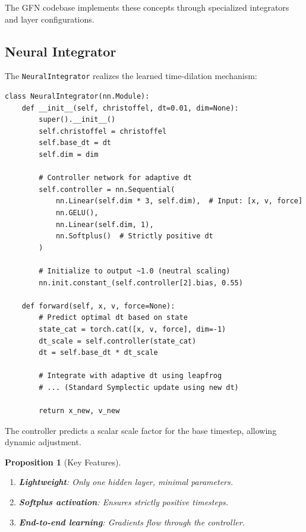 \documentclass[12pt,letterpaper,twoside]{article}
\newtheorem{prop}{Proposition}[section]
\begin{document}
The GFN codebase implements these concepts through specialized integrators and layer configurations.

\subsection{Neural Integrator}

The \texttt{NeuralIntegrator} realizes the learned time-dilation mechanism:

\begin{verbatim}
class NeuralIntegrator(nn.Module):
    def __init__(self, christoffel, dt=0.01, dim=None):
        super().__init__()
        self.christoffel = christoffel
        self.base_dt = dt
        self.dim = dim
        
        # Controller network for adaptive dt
        self.controller = nn.Sequential(
            nn.Linear(self.dim * 3, self.dim),  # Input: [x, v, force]
            nn.GELU(),
            nn.Linear(self.dim, 1),
            nn.Softplus()  # Strictly positive dt
        )
        
        # Initialize to output ~1.0 (neutral scaling)
        nn.init.constant_(self.controller[2].bias, 0.55)
    
    def forward(self, x, v, force=None):
        # Predict optimal dt based on state
        state_cat = torch.cat([x, v, force], dim=-1)
        dt_scale = self.controller(state_cat)
        dt = self.base_dt * dt_scale
        
        # Integrate with adaptive dt using leapfrog
        # ... (Standard Symplectic update using new dt)
        
        return x_new, v_new
\end{verbatim}

The controller predicts a scalar scale factor for the base timestep, allowing dynamic adjustment.

\begin{prop}[Key Features]
\begin{enumerate}
\item \textbf{Lightweight}: Only one hidden layer, minimal parameters.
\item \textbf{Softplus activation}: Ensures strictly positive timesteps.
\item \textbf{End-to-end learning}: Gradients flow through the controller.
\end{enumerate}
\end{prop}
\end{document}
